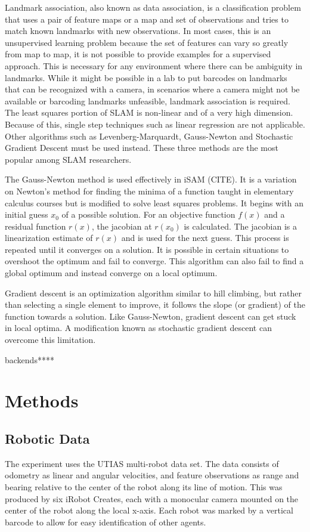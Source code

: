 \documentclass[12pt]{report}
\begin{document}
Landmark association, also known as data association, is a classification problem that uses a pair of feature maps or a map and set of observations and tries to match known landmarks with new observations.  In most cases, this is an unsupervised learning problem because the set of features can vary so greatly from map to map, it is not possible to provide examples for a supervised approach.  This is necessary for any environment where there can be ambiguity in landmarks.  While it might be possible in a lab to put barcodes on landmarks that can be recognized with a camera, in scenarios where a camera might not be available or barcoding landmarks unfeasible, landmark association is required.
The least squares portion of SLAM is non-linear and of a very high dimension.  Because of this, single step techniques such as linear regression are not applicable.  Other algorithms such as Levenberg-Marquardt, Gauss-Newton and Stochastic Gradient Descent must be used instead.  These three methods are the most popular among SLAM researchers.  

	The Gauss-Newton method is used effectively in iSAM (CITE).  It is a variation on Newton’s method for finding the minima of a function taught in elementary calculus courses but is modified to solve least squares problems.  It begins with an initial guess $x_0$ of a possible solution.  For an objective function $f(x)$ and a residual function $r(x)$, the jacobian at $r(x_0)$ is calculated.  The jacobian is a linearization estimate of $r(x)$ and is used for the next guess.  This process is repeated until it converges on a solution.  It is possible in certain situations to overshoot the optimum and fail to converge.  This algorithm can also fail to find a global optimum and instead converge on a local optimum.
	
	Gradient descent is an optimization algorithm similar to hill climbing, but rather than selecting a single element to improve, it follows the slope (or gradient) of the function towards a solution.  Like Gauss-Newton, gradient descent can get stuck in local optima.  A modification known as stochastic gradient descent can overcome this limitation.  


backends****

\chapter{Methods}
\section{Robotic Data}
The experiment uses the UTIAS multi-robot data set.  The data consists of odometry as linear and angular velocities, and feature observations as range and bearing relative to the center of the robot along its line of motion.  This was produced by six iRobot Creates, each with a monocular camera mounted on the center of the robot along the local x-axis.  Each robot was marked by a vertical barcode to allow for easy identification of other agents.
\end{document}

